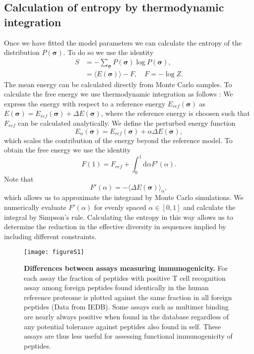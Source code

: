 \documentclass[superscriptaddress,twocolumn,pre]{revtex4}
\newcommand{\B}{\boldsymbol}
\newcommand{\ud}{\mathrm{d}}
\newcommand{\<}{\langle}
\renewcommand{\>}{\rangle}
\begin{document}
\subsection{Calculation of entropy by thermodynamic integration}
Once we have fitted the model parameters we can calculate the entropy of the distribution $P(\B \sigma)$. To do so we use the identity
\begin{align}
    S &= - \sum_{\B \sigma}  P(\B \sigma) \log P(\B \sigma),  \\
      &= \langle E(\B \sigma) \rangle - F, \quad F = - \log Z.
\end{align}
The mean energy can be calculated directly from Monte Carlo samples. To calculate the free energy we use thermodynamic integration as follows \cite{Marchi2019b}: We express the energy with respect to a reference energy $E_{ref}(\B \sigma)$ as $E(\B \sigma) = E_{ref}(\B \sigma) + \Delta E(\B\sigma)$, where the reference energy is choosen such that $F_{ref}$ can be calculated analytically. We define the perturbed energy function
\begin{equation}
    E_\alpha(\B \sigma) = E_{ref}(\B \sigma) + \alpha \Delta E(\B\sigma),
\end{equation}
which scales the contribution of the energy beyond the reference model.
To obtain the free energy we use the identity
\begin{equation}
    F(1) = F_{ref} + \int_0^1 \ud \alpha F'(\alpha).
\end{equation}
Note that
\begin{equation}
    F'(\alpha) = - \langle \Delta E(\B \sigma) \rangle_{\alpha},
\end{equation}
which allows us to approximate the integrand by Monte Carlo simulations. We numerically evaluate $F'(\alpha)$ for evenly spaced $\alpha \in [0, 1]$ and calculate the integral by Simpson's rule. Calculating the entropy in this way allows us to determine the reduction in the effective diversity in sequences implied by including different constraints. 

\clearpage

\begin{figure}
     \texttt{[image: figureS1]}
     \caption{
         {\bf Differences between assays measuring immunogenicity.}
         For each assay the fraction of peptides with positive T cell recognition assay among foreign peptides found identically in the human reference proteome is plotted against the same fraction in all foreign peptides (Data from IEDB). Some assays such as multimer binding are nearly always positive when found in the database regardless of any potential tolerance against peptides also found in self. These assays are thus less useful for assessing functional immunogenicity of peptides.
     \label{figureS1}
     }
\end{figure}
\end{document}
